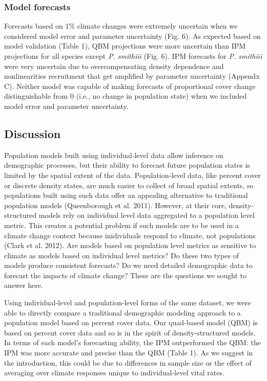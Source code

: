 \documentclass[12pt,]{article}
\begin{document}
\subsubsection{Model forecasts}\label{model-forecasts}

Forecasts based on 1\% climate changes were extremely uncertain when we
considered model error and parameter uncertainty (Fig. 6). As expected
based on model validation (Table 1), QBM projections were more uncertain
than IPM projections for all species except \emph{P. smithiii} (Fig. 6).
IPM forecasts for \emph{P. smithiii} were very uncertain due to
overcompensating density dependence and nonlinearities recruitment that
get amplified by parameter uncertainty (Appendx C). Neither model was
capable of making forecasts of proportional cover change distinguishable
from 0 (i.e., no change in population state) when we included model
error and parameter uncertainty.

\subsection{Discussion}\label{discussion}

Population models built using individual-level data allow inference on
demographic processes, but their ability to forecast future population
states is limited by the spatial extent of the data. Population-level
data, like percent cover or discrete density states, are much easier to
collect of broad spatial extents, so populations built using such data
offer an appealing alternative to traditional population models
(Queenborough et al. 2011). However, at their core, density-structured
models rely on individual level data aggregated to a population level
metric. This creates a potential problem if such models are to be used
in a climate change context because inidividuals respond to climate, not
populations (Clark et al. 2012). Are models based on population level
metrics as sensitive to climate as models based on individual level
metrics? Do these two types of models produce consistent forecasts? Do
we need detailed demographic data to forecast the impacts of climate
change? These are the questions we sought to answer here.

Using individual-level and population-level forms of the same dataset,
we were able to directly compare a traditional demographic modeling
approach to a population model based on percent cover data. Our
quad-based model (QBM) is based on percent cover data and so is in the
spirit of density-structured models. In terms of each model's
forecasting ability, the IPM outperformed the QBM: the IPM was more
accurate and precise than the QBM (Table 1). As we suggest in the
introduction, this could be due to differences in sample size or the
effect of averaging over climate responses unique to individual-level
vital rates.
\end{document}
